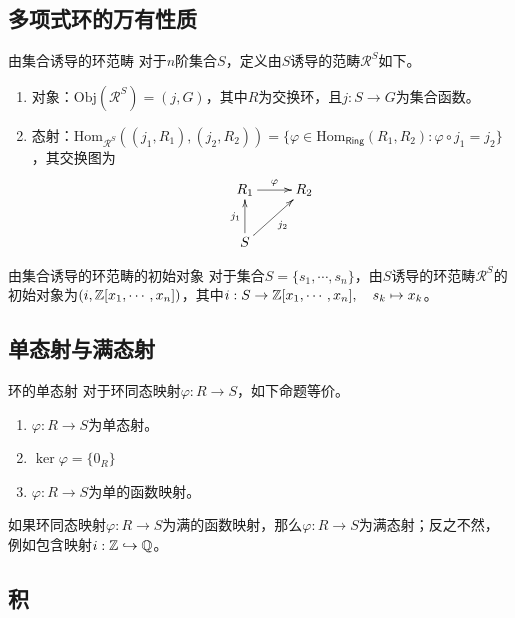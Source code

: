 \subsection{多项式环的万有性质}

\begin{definition}{由集合诱导的环范畴}
	对于$n$阶集合$S$，定义由$S$诱导的范畴$\mathscr{R}^{S}$如下。
	\begin{enumerate}
		\item 对象：$\mathrm{Obj}(\mathscr{R}^S)=(j,G)$，其中$R$为交换环，且$j:S\to G$为集合函数。
		\item 态射：$\mathrm{Hom}_{\mathscr{R}^S}((j_1,R_1),(j_2,R_2))=\{ \varphi\in\mathrm{Hom}_{\mathsf{Ring}}(R_1,R_2): \varphi\circ j_1=j_2 \}$，其交换图为
		$$
		\xymatrix{
			R_1 \ar[r]^{\varphi} & R_2\\
			S \ar[u]^{j_1} \ar[ur]_{j_2}
		}
		$$
	\end{enumerate}
\end{definition}

\begin{proposition}{由集合诱导的环范畴的初始对象}
	对于集合$S=\{s_1,\cdots,s_n\}$，由$S$诱导的环范畴$\mathscr{R}^{S}$的初始对象为$(i,\mathbb{Z}[x_1,\cdots,x_n])$，其中$i:S\to \mathbb{Z}[x_1,\cdots,x_n],\quad s_k\mapsto x_k$。
\end{proposition}

\subsection{单态射与满态射}

\begin{proposition}{}{环的单态射}
	对于环同态映射$\varphi:R\to S$，如下命题等价。
	\begin{enumerate}
		\item $\varphi:R\to S$为单态射。
		\item $\ker\varphi=\{0_R\}$
		\item $\varphi:R\to S$为单的函数映射。
	\end{enumerate}
\end{proposition}
	
\begin{proposition}
	如果环同态映射$\varphi:R\to S$为满的函数映射，那么$\varphi:R\to S$为满态射；反之不然，例如包含映射$i:\mathbb{Z}\hookrightarrow \mathbb{Q}$。
\end{proposition}

\subsection{积}

